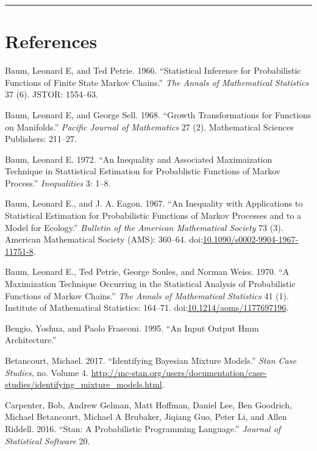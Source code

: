 \documentclass[]{article}
\begin{document}
\begin{center}\rule{0.5\linewidth}{\linethickness}\end{center}

\section{References}\label{references}

\hypertarget{refs}{}
\hypertarget{ref-baum1966statistical}{}
Baum, Leonard E, and Ted Petrie. 1966. ``Statistical Inference for
Probabilistic Functions of Finite State Markov Chains.'' \emph{The
Annals of Mathematical Statistics} 37 (6). JSTOR: 1554--63.

\hypertarget{ref-baum1968growth}{}
Baum, Leonard E, and George Sell. 1968. ``Growth Transformations for
Functions on Manifolds.'' \emph{Pacific Journal of Mathematics} 27 (2).
Mathematical Sciences Publishers: 211--27.

\hypertarget{ref-baum1972inequality}{}
Baum, Leonard E. 1972. ``An Inequality and Associated Maximaization
Technique in Stattistical Estimation for Probablistic Functions of
Markov Process.'' \emph{Inequalities} 3: 1--8.

\hypertarget{ref-baum1967inequality}{}
Baum, Leonard E., and J. A. Eagon. 1967. ``An Inequality with
Applications to Statistical Estimation for Probabilistic Functions of
Markov Processes and to a Model for Ecology.'' \emph{Bulletin of the
American Mathematical Society} 73 (3). American Mathematical Society
(AMS): 360--64.
doi:\href{https://doi.org/10.1090/s0002-9904-1967-11751-8}{10.1090/s0002-9904-1967-11751-8}.

\hypertarget{ref-baum1970maximization}{}
Baum, Leonard E., Ted Petrie, George Soules, and Norman Weiss. 1970. ``A
Maximization Technique Occurring in the Statistical Analysis of
Probabilistic Functions of Markov Chains.'' \emph{The Annals of
Mathematical Statistics} 41 (1). Institute of Mathematical Statistics:
164--71.
doi:\href{https://doi.org/10.1214/aoms/1177697196}{10.1214/aoms/1177697196}.

\hypertarget{ref-bengio1995input}{}
Bengio, Yoshua, and Paolo Frasconi. 1995. ``An Input Output Hmm
Architecture.''

\hypertarget{ref-betancourt2017identifying}{}
Betancourt, Michael. 2017. ``Identifying Bayesian Mixture Models.''
\emph{Stan Case Studies}, no. Volume 4.
\url{http://mc-stan.org/users/documentation/case-studies/identifying_mixture_models.html}.

\hypertarget{ref-carpenter2016stan}{}
Carpenter, Bob, Andrew Gelman, Matt Hoffman, Daniel Lee, Ben Goodrich,
Michael Betancourt, Michael A Brubaker, Jiqiang Guo, Peter Li, and Allen
Riddell. 2016. ``Stan: A Probabilistic Programming Language.''
\emph{Journal of Statistical Software} 20.
\end{document}
